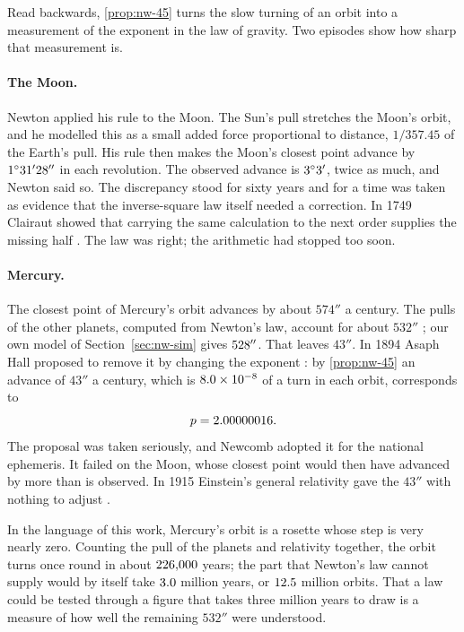 Read backwards, \cref{prop:nw-45} turns the slow turning of an orbit into a measurement of the exponent in the law of gravity. Two episodes show how sharp that measurement is.

\paragraph{The Moon.} Newton applied his rule to the Moon. The Sun's pull stretches the Moon's orbit, and he modelled this as a small added force proportional to distance, $1/357.45$ of the Earth's pull. His rule then makes the Moon's closest point advance by $1^\circ 31' 28''$ in each revolution. The observed advance is $3^\circ 3'$, twice as much, and Newton said so. The discrepancy stood for sixty years and for a time was taken as evidence that the inverse-square law itself needed a correction. In 1749 Clairaut showed that carrying the same calculation to the next order supplies the missing half \citep{Clairaut1752}. The law was right; the arithmetic had stopped too soon.

\paragraph{Mercury.} The closest point of Mercury's orbit advances by about $574''$ a century. The pulls of the other planets, computed from Newton's law, account for about $532''$ \citep{Clemence1947}; our own model of Section~\ref{sec:nw-sim} gives $528''$. That leaves $43''$. In 1894 Asaph Hall proposed to remove it by changing the exponent \citep{Hall1894}: by \cref{prop:nw-45} an advance of $43''$ a century, which is $8.0 \times 10^{-8}$ of a turn in each orbit, corresponds to
\[
p = 2.00000016 .
\]
The proposal was taken seriously, and Newcomb adopted it for the national ephemeris. It failed on the Moon, whose closest point would then have advanced by more than is observed. In 1915 Einstein's general relativity gave the $43''$ with nothing to adjust \citep{Einstein1915}.

In the language of this work, Mercury's orbit is a rosette whose step is very nearly zero. Counting the pull of the planets and relativity together, the orbit turns once round in about $226{,}000$ years; the part that Newton's law cannot supply would by itself take $3.0$ million years, or $12.5$ million orbits. That a law could be tested through a figure that takes three million years to draw is a measure of how well the remaining $532''$ were understood.

